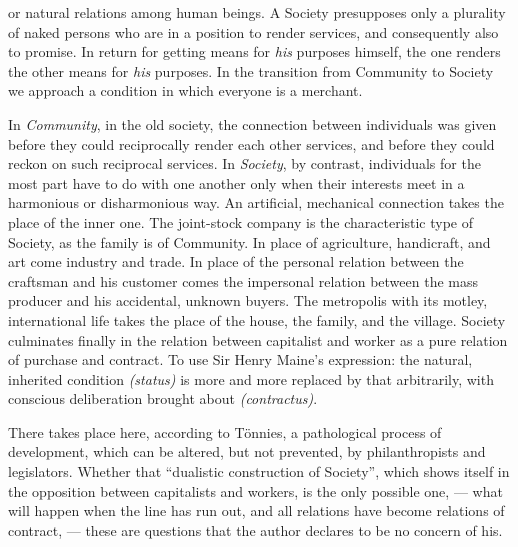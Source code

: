 \documentclass[12pt,a4paper,openany]{book}
\newcommand{\opage}[1]{\marginnote{\footnotesize\textit{[#1]}}}
\begin{document}
or natural relations among human beings. A
Society presupposes only a plurality of naked persons who
\opage{147}are in a position to render services, and consequently also to promise. In return for
getting means for \emph{his} purposes himself, the one renders the other
means for \emph{his} purposes. In the transition from Community
to Society we approach a condition in which everyone is
a merchant.

In \emph{Community}, in the old society, the connection
between individuals was given before they could reciprocally render
each other services, and before they could reckon on such
reciprocal services. In \emph{Society}, by contrast, individuals for
the most part have to do with one another only when their interests
meet in a harmonious or disharmonious way. An artificial,
mechanical connection takes the place of the inner one.
The joint-stock company is the characteristic type of Society, as
the family is of Community. In place of agriculture,
handicraft, and art come industry and trade. In place of
the personal relation between the craftsman and his customer
comes the impersonal relation between the mass producer and
his accidental, unknown buyers. The metropolis with its
motley, international life takes the place of the house,
the family, and the village. Society culminates finally in
the relation between capitalist and worker as a pure relation of purchase and
contract. To use Sir Henry Maine's expression:
the natural, inherited condition \emph{(status)} is more and
more replaced by that arbitrarily, with conscious deliberation brought about
\emph{(contractus)}.

There takes place here, according to Tönnies, a pathological
process of development, which can be altered, but not prevented, by
philanthropists and legislators. Whether that ``dualistic
construction of Society'', which shows itself in the opposition between
capitalists and workers, is the only possible one, --- what
will happen when the line has run out, and all relations have
become relations of contract, --- these are questions that
the author declares to be no concern of his.
\end{document}
